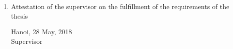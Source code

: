 \begin{requirement}
\begin{enumerate}[leftmargin=*]
	\item Attestation of the supervisor on the fulfillment of the requirements of the thesis
	\flushright
	\begin{minipage}{0.5\linewidth}
		\centering
		Hanoi, 28 May, 2018\\
		Supervisor\\
		\vspace{30pt}
		\supervisor
	\end{minipage}	
\end{enumerate}
\end{requirement}